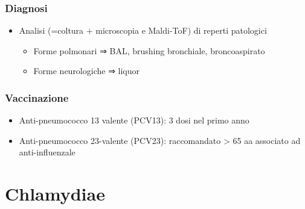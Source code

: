 \documentclass[italian,]{article}
\providecommand{\tightlist}{%
  \setlength{\itemsep}{0pt}\setlength{\parskip}{0pt}}
\begin{document}
\hypertarget{diagnosi-1}{%
\subsubsection{Diagnosi}\label{diagnosi-1}}

\begin{itemize}
\tightlist
\item
  Analisi (=coltura + microscopia e Maldi-ToF) di reperti patologici

  \begin{itemize}
  \tightlist
  \item
    Forme polmonari ⇒ BAL, brushing bronchiale, broncoaspirato
  \item
    Forme neurologiche ⇒ liquor
  \end{itemize}
\end{itemize}

\hypertarget{vaccinazione-1}{%
\subsubsection{Vaccinazione}\label{vaccinazione-1}}

\begin{itemize}
\tightlist
\item
  Anti-pneumococco 13 valente (PCV13): 3 dosi nel primo anno
\item
  Anti-pneumococco 23-valente (PCV23): raccomandato \textgreater{} 65 aa
  associato ad anti-influenzale
\end{itemize}

\hypertarget{chlamydiae}{%
\section{Chlamydiae}\label{chlamydiae}}
\end{document}
